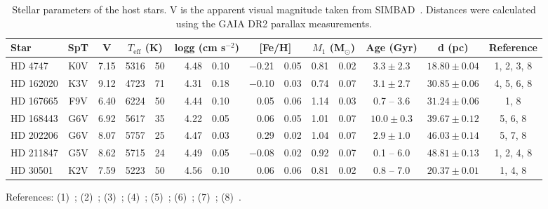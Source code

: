 
\begin{table*}
    \centering
    \begin{threeparttable}[b]
        \caption[Stellar parameters of host stars.]{Stellar parameters of the host stars.
            V is the apparent visual magnitude taken from {SIMBAD}~\citep{wenger_simbad_2000}.
            Distances were calculated using the GAIA DR2 parallax measurements.}
        \begin{tabular}{l c c r@{$~\pm~$}l r@{$~\pm~$}l r@{$~\pm~$}l r@{$~\pm~$}l c c c}
            \toprule
            Star & SpT & V & \multicolumn{2}{c}{\(T_{\textrm{eff}}\) (K)} & \multicolumn{2}{c}{logg (cm s\(^{-2} \))} & \multicolumn{2}{c}{[Fe/H]} & \multicolumn{2}{c}{\(M_1\) (\textrm{M}\(_{\odot} \))} & Age (Gyr) & d (pc) & Reference\\
            \midrule
            {HD 4747} & K0V & 7.15 & 5316 & 50 & 4.48 & 0.10 & $-$0.21 & 0.05 & 0.81 & 0.02 & $3.3 \pm 2.3$ & $18.80 \pm 0.04$ & 1, 2, 3, 8 \\
            {HD 162020} & K3V & 9.12 & 4723 & 71 & 4.31 & 0.18 & $-$0.10 & 0.03 & 0.74 & 0.07 & $3.1 \pm 2.7$ & $30.85 \pm 0.06$ & 4, 5, 6, 8 \\
            {HD 167665} & F9V & 6.40 & 6224 & 50 & 4.44 & 0.10 & 0.05 & 0.06 & 1.14 & 0.03 & 0.7 -- 3.6 & $ 31.24 \pm 0.06$ & 1, 8 \\
            {HD 168443} & G6V & 6.92 & 5617 & 35 & 4.22 & 0.05 & 0.06 & 0.05 & 1.01 & 0.07 & $10.0 \pm 0.3$ & $39.67 \pm 0.12$ & 5, 6, 8 \\
            {HD 202206} & G6V & 8.07 & 5757 & 25 & 4.47 & 0.03 & 0.29 & 0.02 & 1.04 & 0.07 & $2.9 \pm 1.0$ & $46.03 \pm 0.14$ & 5, 7, 8 \\
            {HD 211847} & G5V & 8.62 & 5715 & 24 & 4.49 & 0.05 & $-$0.08 & 0.02 & 0.92 & 0.07 & 0.1 -- 6.0 & $48.81 \pm 0.13 $ & 1, 2, 4, 8 \\
            {HD 30501} & K2V & 7.59 & 5223 & 50 & 4.56 & 0.10 & 0.06 & 0.06 & 0.81 & 0.02 & 0.8 -- 7.0 & $20.37 \pm 0.01$ & 1, 4, 8 \\
            \bottomrule
        \end{tabular} \label{tab:star_params}
        \begin{tablenotes}
           \item[] References: (1)~\citet{sahlmann_search_2011}; (2)~\citet{santos_spectroscopic_2005}; (3)~\citet{crepp_trends_2016}; (4)~\citet{tsantaki_deriving_2013}; (5)~\cite{bonfanti_age_2016}; (6)~\citet{santos_spectroscopic_2004}; (7)~\citet{sousa_spectroscopic_2008}; (8)~\citet{gaiacollaboration_gaia_2018}.
        \end{tablenotes}
    \end{threeparttable}
\end{table*}
